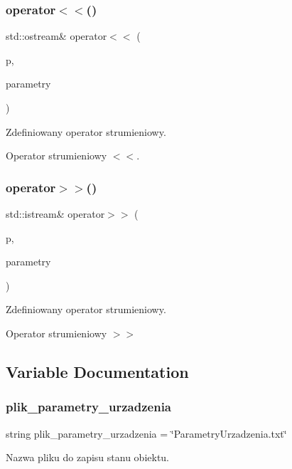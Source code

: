 \subsubsection{operator$<$$<$()}
{\footnotesize\ttfamily std\+::ostream\& operator$<$$<$ (\begin{DoxyParamCaption}\item[{std\+::ostream \&}]{p,  }\item[{\textbf{ Parametry\+Urzadzenia} \&}]{parametry }\end{DoxyParamCaption})}



Zdefiniowany operator strumieniowy. 

Operator strumieniowy $<$$<$. \mbox{\label{_parametry_urzadzenia_8cpp_a3a936bf206691e70cd988e9db437769b}} 
\subsubsection{operator$>$$>$()}
{\footnotesize\ttfamily std\+::istream\& operator$>$$>$ (\begin{DoxyParamCaption}\item[{std\+::istream \&}]{p,  }\item[{\textbf{ Parametry\+Urzadzenia} \&}]{parametry }\end{DoxyParamCaption})}



Zdefiniowany operator strumieniowy. 

Operator strumieniowy $>$$>$ 

\subsection{Variable Documentation}
\mbox{\label{_parametry_urzadzenia_8cpp_a54071ea6d499fcf94192a5f91421529d}} 
\subsubsection{plik\+\_\+parametry\+\_\+urzadzenia}
{\footnotesize\ttfamily string plik\+\_\+parametry\+\_\+urzadzenia = \char`\"{}Parametry\+Urzadzenia.\+txt\char`\"{}}



Nazwa pliku do zapisu stanu obiektu. 

